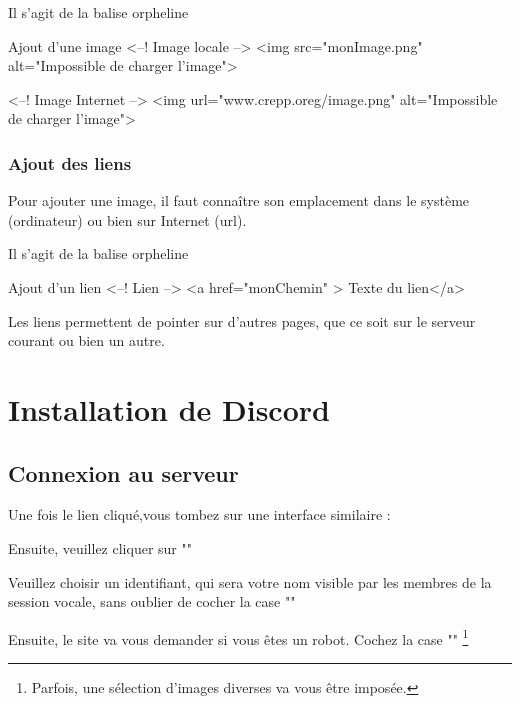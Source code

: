 {Il s'agit de la balise orpheline 

\begin{Html}{Ajout d'une image}
<--! Image locale -->
<img src="monImage.png" alt="Impossible de charger l'image">

<--! Image Internet -->
<img url="www.crepp.oreg/image.png" alt="Impossible de charger l'image">
\end{Html}


\subsection{Ajout des liens}

Pour ajouter une image, il faut connaître son emplacement dans le système (ordinateur) ou bien sur Internet (url).

Il s'agit de la balise orpheline 

\begin{Html}{Ajout d'un lien}
<--! Lien -->
<a href="monChemin" > Texte du lien</a>
\end{Html}
Les liens permettent de pointer sur d'autres pages, que ce soit sur le serveur courant ou bien un autre. \chapter{Installation de Discord}
\section{Connexion au serveur}


Une fois le lien cliqué,vous tombez sur une interface similaire : 


Ensuite, veuillez cliquer sur ""



Veuillez choisir un identifiant, qui sera votre nom visible par les membres de la session vocale, sans oublier de cocher la case ""


Ensuite, le site va vous demander si vous êtes un robot. Cochez la case "" \footnote{Parfois, une sélection d'images diverses va vous être imposée.} \\

}
